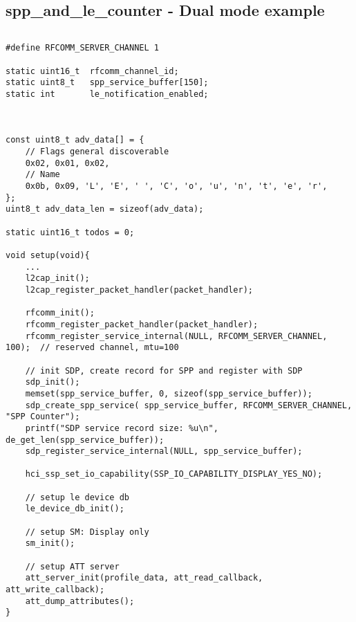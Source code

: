 
\subsection{spp\_and\_le\_counter - Dual mode example}
\label{subsection:sppandlecounter}
$ $
\begin{lstlisting}[float, caption= SPP\&LE client setup., label=code:spp_le_setup]
#define RFCOMM_SERVER_CHANNEL 1

static uint16_t  rfcomm_channel_id;
static uint8_t   spp_service_buffer[150];
static int       le_notification_enabled;



const uint8_t adv_data[] = {
    // Flags general discoverable
    0x02, 0x01, 0x02, 
    // Name
    0x0b, 0x09, 'L', 'E', ' ', 'C', 'o', 'u', 'n', 't', 'e', 'r', 
};
uint8_t adv_data_len = sizeof(adv_data);

static uint16_t todos = 0;

void setup(void){
	...
    l2cap_init();
    l2cap_register_packet_handler(packet_handler);

    rfcomm_init();
    rfcomm_register_packet_handler(packet_handler);
    rfcomm_register_service_internal(NULL, RFCOMM_SERVER_CHANNEL, 100);  // reserved channel, mtu=100

    // init SDP, create record for SPP and register with SDP
    sdp_init();
    memset(spp_service_buffer, 0, sizeof(spp_service_buffer));
    sdp_create_spp_service( spp_service_buffer, RFCOMM_SERVER_CHANNEL, "SPP Counter");
    printf("SDP service record size: %u\n", de_get_len(spp_service_buffer));
    sdp_register_service_internal(NULL, spp_service_buffer);

    hci_ssp_set_io_capability(SSP_IO_CAPABILITY_DISPLAY_YES_NO);

    // setup le device db
    le_device_db_init();

    // setup SM: Display only
    sm_init();

    // setup ATT server
    att_server_init(profile_data, att_read_callback, att_write_callback);    
    att_dump_attributes();
}
\end{lstlisting}

